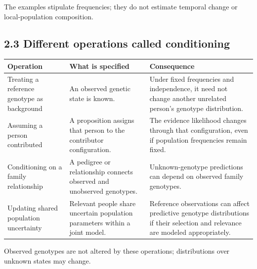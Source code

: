 \documentclass[
]{article}
\newcounter{none} %
\begin{document}
The examples stipulate frequencies; they do not estimate temporal change
or local-population composition.

\subsection{2.3 Different operations called
conditioning}\label{different-operations-called-conditioning}

{\def\LTcaptype{none} %
\begin{longtable}[]{@{}
  >{\raggedright\arraybackslash}p{}
  >{\raggedright\arraybackslash}p{}
  >{\raggedright\arraybackslash}p{}@{}}
\toprule\noalign{}
\begin{minipage}[b]{\linewidth}\raggedright
Operation
\end{minipage} & \begin{minipage}[b]{\linewidth}\raggedright
What is specified
\end{minipage} & \begin{minipage}[b]{\linewidth}\raggedright
Consequence
\end{minipage} \\
\midrule\noalign{}
\endhead
\bottomrule\noalign{}
\endlastfoot
Treating a reference genotype as background & An observed genetic state
is known. & Under fixed frequencies and independence, it need not change
another unrelated person's genotype distribution. \\
Assuming a person contributed & A proposition assigns that person to the
contributor configuration. & The evidence likelihood changes through
that configuration, even if population frequencies remain fixed. \\
Conditioning on a family relationship & A pedigree or relationship
connects observed and unobserved genotypes. & Unknown-genotype
predictions can depend on observed family genotypes. \\
Updating shared population uncertainty & Relevant people share uncertain
population parameters within a joint model. & Reference observations can
affect predictive genotype distributions if their selection and
relevance are modeled appropriately. \\
\end{longtable}
}

Observed genotypes are not altered by these operations; distributions
over unknown states may change.
\end{document}
